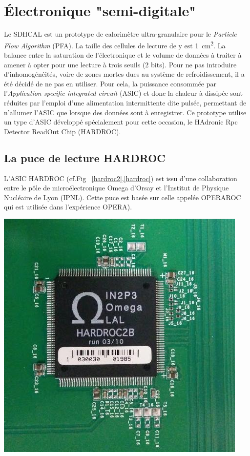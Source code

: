 \section{Électronique "semi-digitale"}
Le SDHCAL est un prototype de calorimètre ultra-granulaire pour le \textit{Particle Flow Algorithm} (PFA). La taille des cellules de lecture de y est  \SI{1}{\square\centi\meter}. La balance entre la saturation de l'électronique et le volume de données à traiter à amener à opter pour une lecture à trois seuils (\num{2} bits). Pour ne pas introduire d'inhomogénéités, voire de zones mortes dues au système de refroidissement, il a été décidé de ne pas en utiliser. Pour cela, la puissance consommée par l'\textit{Application-specific integrated circuit} (ASIC) et donc la chaleur à dissipée sont réduites par l'emploi d'une alimentation intermittente dite pulsée, permettant de n'allumer l'ASIC que lorsque des données sont à enregistrer. Ce prototype utilise un type d'ASIC développé spécialement pour cette occasion, le HAdronic Rpc Detector ReadOut Chip (HARDROC)\cite{Dulucq:2010ssa}.

\subsection{La puce de lecture HARDROC}
L'ASIC HARDROC (cf.Fig~ \ref{hardroc2},\ref{hardroc}) est issu d'une collaboration entre le pôle de microélectronique Omega d'Orsay et l'Institut de Physique Nucléaire de Lyon (IPNL). Cette puce est basée sur celle appelée OPERAROC qui est utilisée dans l'expérience OPERA).

\marginpar
{
	\centering
	\includegraphics[width=\marginparwidth]{GLA/hardroc2.jpg}
	\label{hardroc2}
}

